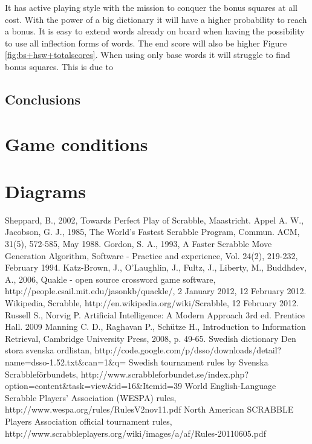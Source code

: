 \documentclass[a4paper, 12pt]{report}
\begin{document}
It has active playing style with the mission to conquer the bonus squares at all cost. With the power of a big dictionary it will have a higher probability to reach a bonus. It is easy to extend words already on board when having the possibility to use all inflection forms of words. The end score will also be higher Figure \ref{fig:bs+hsw+totalscores}. When using only base words it will struggle to find bonus squares. This is due to 

\section{Conclusions}


\appendix
\chapter{Game conditions}
\graphicspath{{images/}}






\chapter{Diagrams}







\begin{thebibliography}{100}  
   Sheppard, B., 2002, Towards Perfect Play of Scrabble, Maastricht.
   Appel A. W., Jacobson, G. J., 1985, The World’s Fastest Scrabble Program, Commun. ACM, 31(5), 572-585, May 1988.
 Gordon, S. A., 1993, A Faster Scrabble Move Generation Algorithm, Software - Practice and experience, Vol. 24(2), 219-232, February 1994.
 Katz-Brown, J., O’Laughlin, J., Fultz, J., Liberty, M., Buddhdev, A., 2006, Quakle - open source crossword game software, http://people.csail.mit.edu/jasonkb/quackle/, 2 January 2012,  12 February 2012.
 Wikipedia, Scrabble, http://en.wikipedia.org/wiki/Scrabble, 12 February 2012.
 Russell S., Norvig P. Artificial Intelligence: A Modern Approach 3rd ed. Prentice Hall. 2009
 Manning C. D., Raghavan P., Schütze H., Introduction to Information Retrieval, Cambridge University Press, 2008, p. 49-65.
 Swedish dictionary Den stora svenska ordlistan, http://code.google.com/p/dsso/downloads/detail?name=dsso-1.52.txt\&can=1\&q=
 Swedish tournament rules by Svenska Scrabbleförbundets, http://www.scrabbleforbundet.se/index.php?option=content\&task=view\&id=16\&Itemid=39
 World English-Language Scrabble Players’ Association (WESPA) rules, http://www.wespa.org/rules/RulesV2nov11.pdf
 North American SCRABBLE Players Association official tournament rules, http://www.scrabbleplayers.org/wiki/images/a/af/Rules-20110605.pdf
\end{thebibliography}
\end{document}
